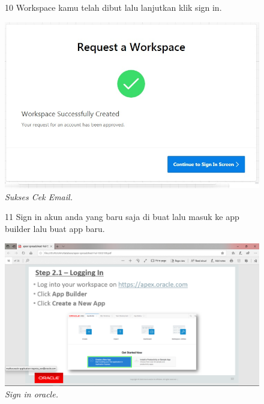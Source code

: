 \begin{enumerate}
\begin{figure}
\item[10] Workspace kamu telah dibut lalu lanjutkan klik sign in.

    \begin{center}
\includegraphics[scale=0.5]{figures/req8.jpg}
    \caption{\textit{Sukses Cek Email.}}
        \end{center}
\label{gambar}
\end{figure}

\begin{figure}
\item[11] Sign in akun anda yang baru saja di buat lalu masuk ke app builder lalu buat app baru.

    \begin{center}
\includegraphics[scale=0.3]{figures/pic(4).png}
    \caption{\textit{Sign in oracle.}}
        \end{center}
\label{gambar}
\end{figure}


\end{enumerate}
